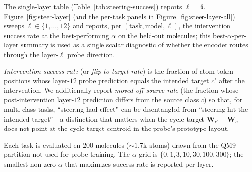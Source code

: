  The single-layer table (Table~\ref{tab:steering-success}) reports $\ell{=}6$. Figure~\ref{fig:steer-layer} (and the per-task panels in Figure~\ref{fig:steer-layer-all}) sweeps $\ell \in \{1, \ldots, 12\}$ and reports, per $(\text{task}, \text{model}, \ell)$, the intervention success rate at the best-performing $\alpha$ on the held-out molecules; this best-$\alpha$-per-layer summary is used as a single scalar diagnostic of whether the encoder routes through the layer-$\ell$ probe direction.

 \emph{Intervention success rate} (or \emph{flip-to-target rate}) is the fraction of atom-token positions whose layer-$12$ probe prediction equals the intended target $c'$ after the intervention. We additionally report \emph{moved-off-source rate} (the fraction whose post-intervention layer-$12$ prediction differs from the source class $c$) so that, for multi-class tasks, ``steering had effect'' can be disentangled from ``steering hit the intended target''---a distinction that matters when the cycle target $\mathbf{W}_{c'}-\mathbf{W}_{c}$ does not point at the cycle-target centroid in the probe's prototype layout.

 Each task is evaluated on $200$ molecules ($\sim 1.7$k atoms) drawn from the QM9 partition not used for probe training. The $\alpha$ grid is $\{0, 1, 3, 10, 30, 100, 300\}$; the smallest non-zero $\alpha$ that maximizes success rate is reported per layer.
